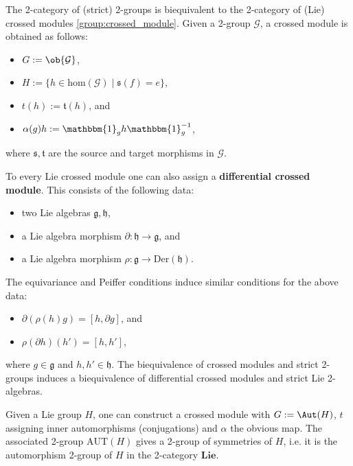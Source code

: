     \begin{property}
        The 2-category of (strict) 2-groups is biequivalent to the 2-category of (Lie) crossed modules \ref{group:crossed_module}. Given a 2-group $\mathcal{G}$, a crossed module is obtained as follows:
        \begin{itemize}
            \item $G:=\ob{\mathcal{G}}$,
            \item $H:=\{h\in\mathrm{hom}(\mathcal{G})\mid\mathfrak{s}(f)=e\}$,
            \item $t(h):=\mathfrak{t}(h)$, and
            \item $\alpha(g)h := \mathbbm{1}_gh\mathbbm{1}_g^{-1}$,
        \end{itemize}
        where $\mathfrak{s},\mathfrak{t}$ are the source and target morphisms in $\mathcal{G}$.

        To every Lie crossed module one can also assign a \textbf{differential crossed module}. This consists of the following data:
        \begin{itemize}
            \item two Lie algebras $\mathfrak{g},\mathfrak{h}$,
            \item a Lie algebra morphism $\partial:\mathfrak{h}\rightarrow\mathfrak{g}$, and
            \item a Lie algebra morphism $\rho:\mathfrak{g}\rightarrow\text{Der}(\mathfrak{h})$.
        \end{itemize}
        The equivariance and Peiffer conditions induce similar conditions for the above data:
        \begin{itemize}
            \item $\partial(\rho(h)g) = [h,\partial g]$, and
            \item $\rho(\partial h)(h') = [h,h']$,
        \end{itemize}
        where $g\in\mathfrak{g}$ and $h,h'\in\mathfrak{h}$. The biequivalence of crossed modules and strict 2-groups induces a biequivalence of differential crossed modules and strict Lie 2-algebras.
    \end{property}

    \begin{example}
        Given a Lie group $H$, one can construct a crossed module with $G:=\Aut(H)$, $t$ assigning inner automorphisms (conjugations) and $\alpha$ the obvious map. The associated 2-group $\mathrm{AUT}(H)$ gives a 2-group of symmetries of $H$, i.e. it is the automorphism 2-group of $H$ in the 2-category $\mathbf{Lie}$.
    \end{example}

